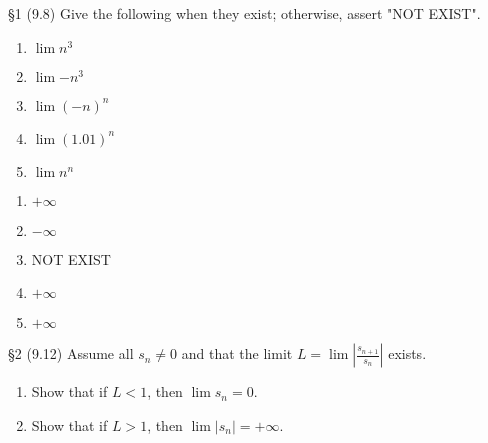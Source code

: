 \documentclass{homework}
\begin{document}
\begin{problem}{\S 1}
  (9.8) Give the following when they exist; otherwise, assert "NOT EXIST".
  \begin{enumerate}[label=(\alph*)]
    \item $\lim{n^3}$
    \item $\lim{-n^3}$ 
    \item $\lim{(-n)^{n}}$
    \item $\lim{(1.01)^{n}}$
    \item $\lim{n^{n}}$
  \end{enumerate}
\end{problem}

\begin{solution}
  \begin{enumerate}[label=(\alph*)]
    \item $+\infty$ 
    \item $-\infty$
    \item NOT EXIST
    \item $+\infty$
    \item $+\infty$
  \end{enumerate}
\end{solution}

\begin{problem}{\S 2}
  (9.12) Assume all $s_n\neq 0$ and that the limit $L=\lim{\left| \frac{s_{n+1}}{s_n} \right| }$
  exists.
  \begin{enumerate}[label=(\alph*)]
    \item Show that if $L<1$, then $\lim{s_n}=0$.
    \item Show that if $L>1$, then $\lim{\left| s_n \right| }=+\infty$.
  \end{enumerate}
\end{problem}
\end{document}
